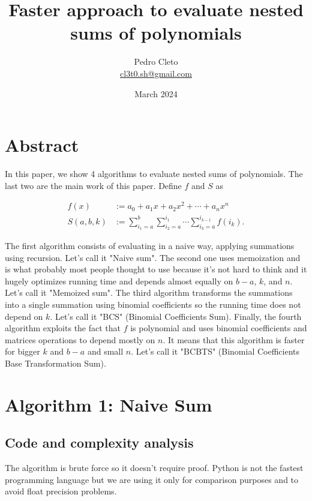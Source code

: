 \documentclass[12pt]{article}
\title{Faster approach to evaluate nested sums of polynomials}
\author{Pedro Cleto \\ \href{mailto:cl3t0.sh@gmail.com}{cl3t0.sh@gmail.com} }
\date{March 2024}
\begin{document}
\newtheorem{theorem}{Theorem}
\newtheorem{corollary}{Corollary}[theorem]
\newtheorem{lemma}[theorem]{Lemma}

\maketitle

\section{Abstract}

In this paper, we show 4 algorithms to evaluate nested sums of polynomials. The last two are the main work of this paper. Define $f$ and $S$ as

\begin{align*}
    f(x)       & := a_0 + a_1 x + a_2 x^2 + \cdots + a_n x^n                               \\
    S(a, b, k) & := \sum_{i_1=a}^{b}\sum_{i_2=a}^{i_1}\cdots\sum_{i_k=a}^{i_{k-1}} f(i_k).
\end{align*}

The first algorithm consists of evaluating in a naive way, applying summations using recursion. Let's call it "Naive sum". The second one uses memoization and is what probably most people thought to use because it's not hard to think and it hugely optimizes running time and depends almost equally on $b - a$, $k$, and $n$. Let's call it "Memoized sum". The third algorithm transforms the summations into a single summation using binomial coefficients so the running time does not depend on $k$. Let's call it "BCS" (Binomial Coefficients Sum). Finally, the fourth algorithm exploits the fact that $f$ is polynomial and uses binomial coefficients and matrices operations to depend mostly on $n$. It means that this algorithm is faster for bigger $k$ and $b - a$ and small $n$. Let's call it "BCBTS" (Binomial Coefficients Base Transformation Sum).

\section{Algorithm 1: Naive Sum}

\subsection{Code and complexity analysis}

The algorithm is brute force so it doesn't require proof. Python is not the fastest programming language but we are using it only for comparison purposes and to avoid float precision problems.
\end{document}
